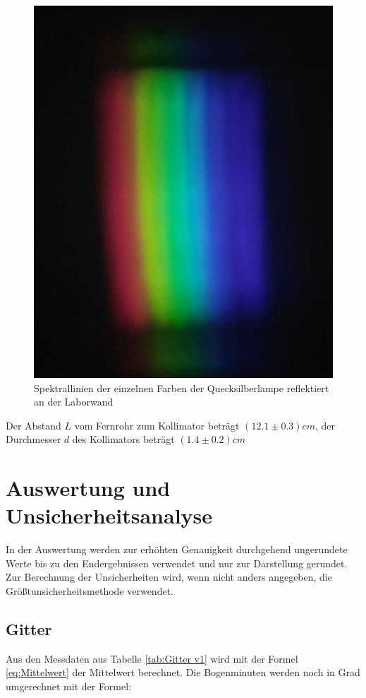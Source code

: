 \documentclass[12pt,a4paper,twoside]{article}
\begin{document}
\begin{figure}[H]
    \centering
    \includegraphics[width=0.6\linewidth]{nudes/rgb wand.jpg}
    \caption{Spektrallinien der einzelnen Farben der Quecksilberlampe reflektiert an der Laborwand}
    \label{fig:spektallinien Prisma}
\end{figure}

\noindent
Der Abstand $L$ vom Fernrohr zum Kollimator beträgt $(12.1 \pm 0.3)cm$, der Durchmesser $d$ des Kollimators beträgt $(1.4 \pm 0.2)cm$


\section{Auswertung und Unsicherheitsanalyse} %
In der Auswertung werden zur erhöhten Genauigkeit durchgehend ungerundete Werte bis zu den Endergebnissen verwendet und nur zur Darstellung gerundet. \\
Zur Berechnung der Unsicherheiten wird, wenn nicht anders angegeben, die Größtunsicherheitsmethode verwendet.

\subsection{Gitter}
Aus den Messdaten aus Tabelle \ref{tab:Gitter v1} wird mit der Formel \ref{eq:Mittelwert} der Mittelwert berechnet. Die Bogenminuten werden noch in Grad umgerechnet mit der Formel: 
\end{document}
